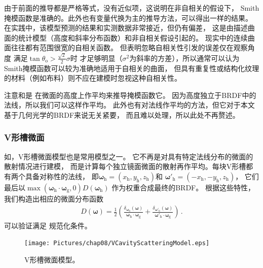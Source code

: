 由于前面的推导都是严格等式，没有近似项，这说明在非自相关的假设下，
Smith掩模函数是准确的。此外也有变量代换为主的推导方法，可以得出一样的结果。
在实践中，该模型预测的结果和实测数据非常接近，但仍有偏差，
这是由描述曲面的统计模型（高度和斜率分布函数）和非自相关假设引起的。
现实中的连续曲面往往都有范围很宽的自相关函数。
但\citet{841905}表明忽略自相关性引发的误差仅在观察角度
满足$\tan\theta_{\mathrm{o}}>\frac{\sqrt{2}}{2}\sigma$时
才足够明显（$\sigma^2$为斜率的方差），所以通常可以认为
Smith掩模函数可以较为准确地适用于自相关的曲面，
但具有重复性或结构化纹理的材料（例如布料）则不应在建模时忽视这种自相关性。

注意和是
在微面的高度上作平均来推导掩模函数它。
因为高度独立于BRDF中的法线，所以我们可以这样作平均。
此外也有对法线作平均的方法，但它对于本文基于几何光学的BRDF来说无关紧要，
而且难以处理，所以此处不再赘述。


\subsubsection*{V形槽微面}
如，V形槽微面模型也是常用模型之一。
它不再是对具有特定法线分布的微面的散射情况进行建模，
而是计算每个独立镜面微面的散射再作平均。每块V形槽都有两个具备对称性的法线，
即${\bm\omega}_{\mathrm{h}}=(x_{\mathrm{h}},y_{\mathrm{h}},z_{\mathrm{h}})$和
${\bm\omega}'_{\mathrm{h}}=(-x_{\mathrm{h}},-y_{\mathrm{h}},z_{\mathrm{h}})$，
它们最后以$\max({\bm\omega}_{\mathrm{h}}\cdot{\bm\omega}_{\mathrm{g}},0)D({\bm\omega}_{\mathrm{h}})$
作为权重合成最终的BRDF。
根据这些特性，我们构造出相应的微面分布函数
\begin{align}\label{eq:08ex01-VCavityScatteringNormalDistribution}
    D({\bm\omega})=\frac{1}{2}\left(
    \frac{\delta_{{\bm\omega}_{\mathrm{h}}}({\bm\omega})}
    {{\bm\omega}_{\mathrm{h}}\cdot{\bm\omega}_{\mathrm{g}}}
    +\frac{\delta_{{\bm\omega}'_{\mathrm{h}}}({\bm\omega})}
    {{\bm\omega}'_{\mathrm{h}}\cdot{\bm\omega}_{\mathrm{g}}}\right)\, .
\end{align}
可以验证满足
规范化条件。

\begin{figure}[htbp]
    \centering
    \texttt{[image: Pictures/chap08/VCavityScatteringModel.eps]}
    \caption{V形槽微面模型。}
    \label{fig:08ex01-V-cavityScatteringModel}
\end{figure}

